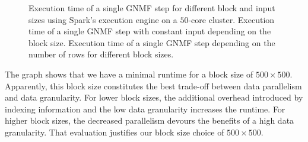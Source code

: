 \begin{figure}
	\centering
	\begin{subfigure}[t]{\dualpgfwidth}
		\caption{}
		\label{fig:blocksizesNMFStep}
	\end{subfigure}
	\begin{subfigure}[t]{\dualpgfwidth}
		\caption{}
		\label{fig:nmfStepDifferentBlocksizes}
	\end{subfigure}
	\caption{Execution time of a single GNMF step for different block and input sizes using Spark's execution engine on a $50$-core cluster.  Execution time of a single GNMF step with constant input depending on the block size.  Execution time of a single GNMF step depending on the number of rows for different block sizes.}
	\label{fig:blocksizes}
\end{figure}

The graph shows that we have a minimal runtime for a block size of $500 \times 500$.
Apparently, this block size constitutes the best trade-off between data parallelism and data granularity.
For lower block sizes, the additional overhead introduced by indexing information and the low data granularity increases the runtime.
For higher block sizes, the decreased parallelism devours the benefits of a high data granularity.
That evaluation justifies our block size choice of $500 \times 500$.

